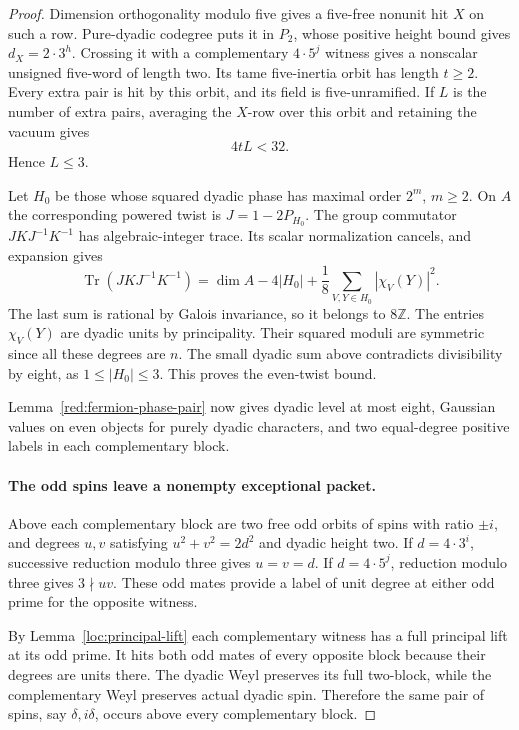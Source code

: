 \documentclass[11pt,a4paper]{article}
\numberwithin{equation}{section}
\begin{document}
\begin{proof}
Dimension orthogonality modulo five gives a five-free nonunit hit
$X$ on such a row. Pure-dyadic codegree puts it in $P_2$, whose
positive height bound gives $d_X=2\cdot3^h$. Crossing it with
a complementary $4\cdot5^j$ witness gives a nonscalar unsigned
five-word of length two. Its tame five-inertia orbit has length
$t\ge2$. Every extra pair is hit by this orbit, and its field is
five-unramified. If $L$ is the number of extra pairs, averaging
the $X$-row over this orbit and retaining the vacuum gives
\[
                              4tL<32.
\]
Hence $L\le3$.

Let $H_0$ be those whose squared dyadic
phase has maximal order $2^m$, $m\ge2$. On $A$ the corresponding
powered twist is $J=1-2P_{H_0}$. The group commutator
$JKJ^{-1}K^{-1}$ has algebraic-integer trace. Its scalar
normalization cancels, and expansion gives
\[
 \operatorname{Tr}(JKJ^{-1}K^{-1})
 =\dim A-4|H_0|+\frac18
                   \sum_{V,Y\in H_0}|\chi_V(Y)|^2.
\]
The last sum is rational by Galois invariance, so it belongs to
$8\mathbb Z$. The entries $\chi_V(Y)$ are dyadic units by principality.
Their squared moduli are symmetric since all these degrees are $n$.
The small dyadic sum above contradicts divisibility by eight, as
$1\le|H_0|\le3$. This proves the even-twist bound.

Lemma~\ref{red:fermion-phase-pair} now gives dyadic level at most
eight, Gaussian values on even objects for purely dyadic
characters, and two equal-degree positive labels in each
complementary block.

\paragraph{The odd spins leave a nonempty exceptional packet.}
Above each complementary block are two free odd orbits of spins
with ratio $\pm i$, and degrees $u,v$ satisfying
$u^2+v^2=2d^2$ and dyadic height two. If $d=4\cdot3^i$,
successive reduction modulo three gives $u=v=d$. If
$d=4\cdot5^j$, reduction modulo three gives $3\nmid uv$.
These odd mates provide a label of unit degree at either odd
prime for the opposite witness.

By Lemma~\ref{loc:principal-lift} each complementary witness has a
full principal lift at its odd prime. It hits both odd mates of every
opposite block because their degrees are units there.
The dyadic Weyl preserves its full
two-block, while the complementary Weyl preserves actual dyadic
spin. Therefore the same pair of spins, say $\delta,i\delta$,
occurs above every complementary block.


\end{proof}
\end{document}
